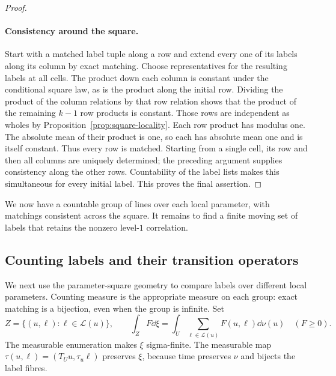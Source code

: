 \begin{proof}
\paragraph{Consistency around the square.}
Start with a matched label tuple along a row and extend every one of
its labels along its column by exact matching. Choose representatives
for the resulting labels at all cells. The product down each column
is constant under the conditional square law, as is the product
along the initial row. Dividing the product of the column relations
by that row relation shows that the product of the remaining $k-1$
row products is constant. Those rows are independent as wholes by
Proposition~\ref{prop:square-locality}. Each row product has modulus
one. The absolute mean of their product is one, so each has absolute
mean one and is itself constant. Thus every row is matched.
Starting from a single cell, its row and then all columns are uniquely
determined; the preceding argument supplies consistency along the
other rows. Countability of the label lists makes this simultaneous
for every initial label. This proves the final assertion.
\end{proof}

We now have a countable group of lines over each local parameter,
with matchings consistent across the square. It remains to find a
finite moving set of labels that retains the nonzero level-$1$
correlation.

\subsection{Counting labels and their transition operators}

We next use the parameter-square geometry to compare labels over
different local parameters. Counting measure is the appropriate
measure on each group: exact matching is a bijection, even when the
group is infinite.
Set
\[
 Z=\{(u,\ell):\ell\in\mathcal L(u)\},\qquad
 \int_Z F\dd\xi=
 \int_U\sum_{\ell\in\mathcal L(u)}F(u,\ell)\dd\nu(u)
 \quad(F\ge0).
\]
The measurable enumeration makes $\xi$ sigma-finite. The measurable
map $\tau(u,\ell)=(T_Uu,\tau_u\ell)$ preserves $\xi$, because time
preserves $\nu$ and bijects the label fibres.

